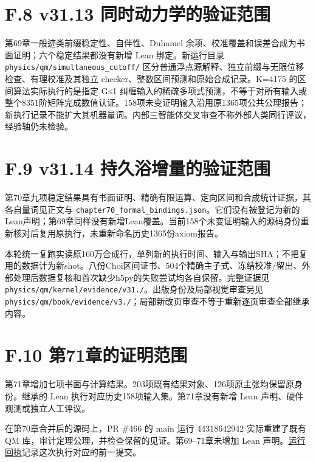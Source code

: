 \documentclass[
  11pt,
  oneside]{book}
\begin{document}
\section{F.8 v31.13 同时动力学的验证范围}

第69章一般迹类前缀稳定性、自伴性、Duhamel
余项、校准覆盖和误差合成为书面证明；六个稳定结果都没有新增 Lean
绑定。新运行目录 \texttt{physics/\allowbreak qm/\allowbreak simultaneous\_\allowbreak cutoff/\allowbreak }
区分普通浮点源解释、独立前缀与无限位移检查、有理校准及其独立
checker、整数区间预测和原始合成记录。K=4175 的区间算法实际执行的是指定
G≤1
纠缠输入的稀疏多项式预测，不等于对所有输入或整个8351阶矩阵完成数值认证。158项未变证明输入沿用原1365项公共公理报告；新执行记录不能扩大其机器量词。内部三智能体交叉审查不称外部人类同行评议，经验轴仍未检验。

\section{F.9 v31.14 持久浴增量的验证范围}

第70章九项稳定结果具有书面证明、精确有限运算、定向区间和合成统计证据，其各自量词见正文与
\texttt{chapter70\_\allowbreak formal\_\allowbreak bindings.\allowbreak json}。它们没有被登记为新的Lean声明；第69章同样没有新增Lean覆盖。当前158个未变证明输入的源码身份重新核对后复用原执行，未重新命名历史1365份axiom报告。

本轮统一复跑实读原160万合成行，单列新的执行时间、输入与输出SHA；不把复用的数据计为新shot。八份Choi区间证书、504个精确主子式、冻结校准/留出、外部处理后数据复核和首次缺少h5py的失败尝试均各自保留。完整证据见
\texttt{physics/\allowbreak qm/\allowbreak kernel/\allowbreak evidence/\allowbreak v31./\allowbreak }。出版身份及局部视觉审查另见
\texttt{physics/\allowbreak qm/\allowbreak book/\allowbreak evidence/\allowbreak v3./\allowbreak }；局部新改页审查不等于重新逐页审查全部继承内容。

\section{F.10 第71章的证明范围}

第71章增加七项书面与计算结果。203项既有结果对象、126项原主张均保留原身份。继承的
Lean 执行对应历史158项输入集。第71章没有新增 Lean
声明、硬件观测或独立人工评议。

在第70章合并后的源码上，PR \#466 的 main 运行 44318642942 实际重建了既有
QM 库，审计定理公理，并检查保留的见证。第69--71章未增加 Lean
声明。\href{../kernel/evidence/v31.14/integration-verification.json}{运行回执}记录这次执行对应的前一提交。
\end{document}
